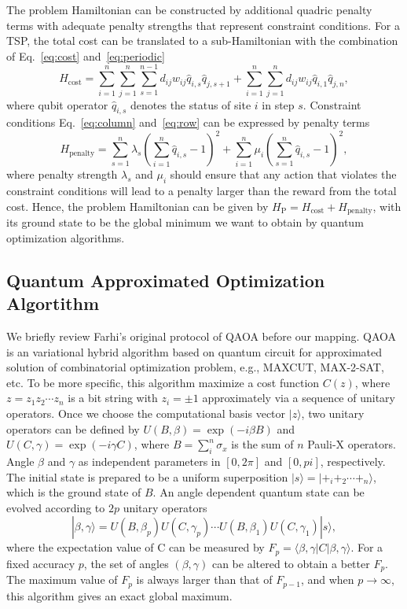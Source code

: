 \documentclass[aps,pra,twocolumn,superscriptaddress]{revtex4-2}
\begin{document}
The problem Hamiltonian can be constructed by additional quadric penalty terms with adequate penalty strengths that represent constraint conditions. For a TSP, the total cost can be translated to a sub-Hamiltonian with the combination of Eq.~\eqref{eq:cost} and~\eqref{eq:periodic}
\begin{equation}
H_{\text{cost}}=\sum_{i=1}^n\sum_{j=1}^n\sum_{s=1}^{n-1}d_{ij}w_{ij}\hat{q}_{i,s}\hat{q}_{j,s+1}+\sum_{i=1}^n\sum_{j=1}^nd_{ij}w_{ij}\hat{q}_{i,1}\hat{q}_{j,n},
\end{equation}
where qubit operator $\hat{q}_{i,s}$ denotes the status of site $i$ in step $s$. Constraint conditions Eq.~\eqref{eq:column} and~\eqref{eq:row} can be expressed by penalty terms
\begin{equation}
H_{\text{penalty}}=\sum_{s=1}^n\lambda_s(\sum_{i=1}^n\hat{q}_{i,s}-1)^2+\sum_{i=1}^n\mu_i(\sum_{s=1}^n\hat{q}_{i,s}-1)^2,
\end{equation}
where penalty strength $\lambda_s$ and $\mu_i$ should ensure that any action that violates the constraint conditions will lead to a penalty larger than the reward from the total cost. Hence, the problem Hamiltonian can be given by $H_{\text{P}}=H_{\text{cost}}+H_{\text{penalty}}$, with its ground state to be the global minimum we want to obtain by quantum optimization algorithms.

\subsection{Quantum Approximated Optimization Algortithm}
We briefly review Farhi's original protocol of QAOA before our mapping. QAOA is an variational hybrid algorithm based on quantum circuit for approximated solution of combinatorial optimization problem, e.g., MAXCUT, MAX-2-SAT, etc. To be more specific, this algorithm maximize a cost function $C(z)$, where $z=z_1z_2\cdots z_n$ is a bit string with $z_i=\pm1$ approximately via a sequence of unitary operators. Once we choose the computational basis vector $|z\rangle$, two unitary operators can be defined by $U(B,\beta)=\exp(-i\beta B)$ and  $U(C,\gamma)=\exp(-i\gamma C)$, where $B=\sum_i^n \sigma_x$ is the sum of $n$ Pauli-X operators. Angle $\beta$ and $\gamma$ as independent parameters in $[0,2\pi]$ and $[0,pi]$, respectively. The initial state is prepared to be a uniform superposition $|s\rangle=|+_i+_2\cdots+_n\rangle$, which is the ground state of $B$. An angle dependent quantum state can be evolved according to $2p$ unitary operators
\begin{equation}
|\beta,\gamma\rangle=U(B,\beta_p)U(C,\gamma_p)\cdots U(B,\beta_1)U(C,\gamma_1)|s\rangle,
\end{equation}
where the expectation value of C can be measured by $F_p=\langle\beta,\gamma|C|\beta,\gamma\rangle$. For a fixed accuracy $p$, the set of angles $(\beta,\gamma)$ can be altered to obtain a better $F_p$. The maximum value of $F_p$ is always larger than that of $F_{p-1}$, and when $p\rightarrow\infty$, this algorithm gives an exact global maximum.
\end{document}
